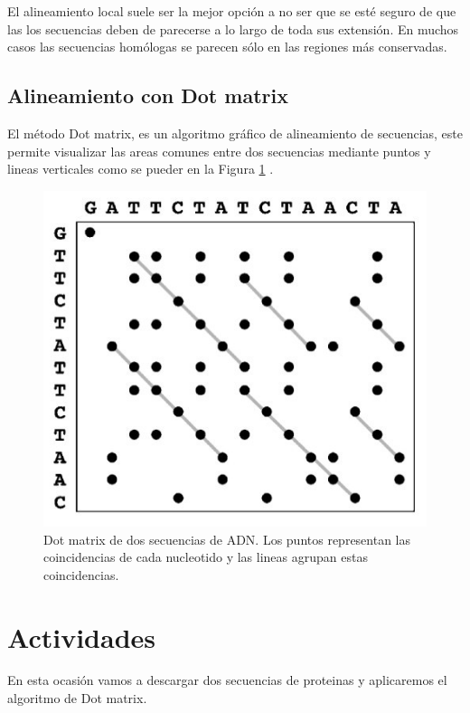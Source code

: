 \documentclass{article}
\begin{document}
El alineamiento local suele ser la mejor opción a no ser que se esté seguro de que las los secuencias deben de parecerse a lo largo de toda sus extensión. En muchos casos las secuencias homólogas se parecen sólo en las regiones más conservadas.

\subsection{Alineamiento con Dot matrix}
El método Dot matrix, es un algoritmo gráfico de alineamiento de secuencias, este permite visualizar las areas comunes entre dos secuencias mediante puntos y lineas verticales como se pueder en la Figura  \ref{img:dot} \cite{xiong2006essential}.

\begin{figure}[h]
 \centering
    \includegraphics[width=\textwidth,height=0.2\textheight,keepaspectratio]{../img/alignment/dot.jpg}
    \caption{Dot matrix de dos secuencias de ADN. Los puntos representan las coincidencias de cada nucleotido y las lineas agrupan estas coincidencias.}
    \label{img:dot}
\end{figure}


\section{Actividades}

En esta ocasión vamos a descargar dos secuencias de proteinas y aplicaremos el algoritmo de Dot matrix.
\end{document}
